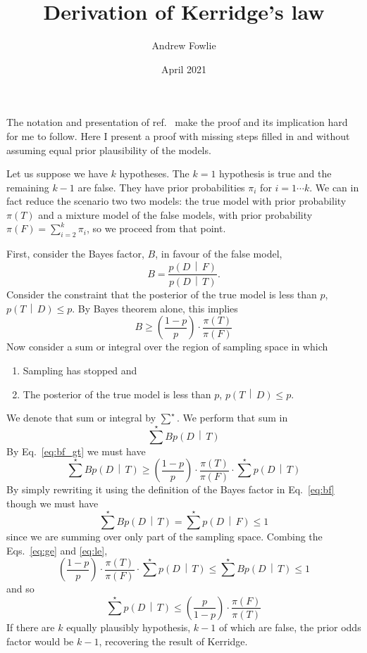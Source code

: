 \documentclass[12pt]{article}
\title{Derivation of Kerridge's law}
\author{Andrew Fowlie}
\date{April 2021}
\affil{Nanjing Normal University}
\newcommand{\refcite}[1]{ref.~\cite{#1}}
\newcommand{\given}{\, \middle| \,}
\newcommand{\prob}[2]{p\left(#1 \given #2 \right)}
\newcommand{\refeq}[1]{Eq.~\ref{#1}}
\newcommand{\refeqs}[2]{Eqs.~\ref{#1} and \ref{#2}}
\begin{document}
\maketitle


%
%

The notation and presentation of \refcite{kerridge1963} make the proof and its implication hard for me to follow. Here I present a proof with missing steps filled in and without assuming equal prior plausibility of the models.

Let us suppose we have $k$ hypotheses. The $k = 1$ hypothesis is true and the remaining $k - 1$ are false. They have prior probabilities $\pi_i$ for $i = 1 \cdots k$. We can in fact reduce the scenario two two models: the true model with prior probability $\pi(T)$ and a mixture model of the false models, with prior probability $\pi(F) = \sum_{i=2}^k \pi_i$, so we proceed from that point.

First, consider the Bayes factor, $B$, in favour of the false model,
\begin{equation}\label{eq:bf}
B = \frac{\prob{D}{F}}{\prob{D}{T}}.
\end{equation}
Consider the constraint that the posterior of the true model is less than $p$, $\prob{T}{D} \le p$. By Bayes theorem alone, this implies
\begin{equation}\label{eq:bf_gt}
B \ge \left(\frac{1 - p}{p}\right) \cdot \frac{\pi(T)}{\pi(F)}
\end{equation}
Now consider a sum or integral over the region of sampling space in which
\begin{enumerate}
    \item Sampling has stopped and
    \item The posterior of the true model is less than $p$, $\prob{T}{D} \le p$. 
\end{enumerate}
We denote that sum or integral by $\sum^\star$. We perform that sum in
\begin{equation}
\sum^\star B \prob{D}{T}
\end{equation}
By \refeq{eq:bf_gt} we must have 
\begin{equation}\label{eq:ge}
\sum^\star B \prob{D}{T} \ge  \left(\frac{1 - p}{p}\right) \cdot \frac{\pi(T)}{\pi(F)} \cdot  \sum^\star \prob{D}{T}
\end{equation}
By simply rewriting it using the definition of the Bayes factor in \refeq{eq:bf} though we must have
\begin{equation}\label{eq:le}
\sum^\star B \prob{D}{T} = \sum^\star \prob{D}{F} \le 1
\end{equation}
since we are summing over only part of the sampling space. Combing the \refeqs{eq:ge}{eq:le},
\begin{equation}
\left(\frac{1 - p}{p}\right) \cdot \frac{\pi(T)}{\pi(F)} \cdot \sum^\star \prob{D}{T} \le \sum^\star B \prob{D}{T} \le 1
\end{equation}
and so 
\begin{equation}
\sum^\star \prob{D}{T} \le \left(\frac{p}{1 - p}\right) \cdot\frac{\pi(F)}{\pi(T)} 
\end{equation}
If there are $k$ equally plausibly hypothesis, $k-1$ of which are false, the prior odds factor would be $k-1$, recovering the result of Kerridge.
\end{document}
